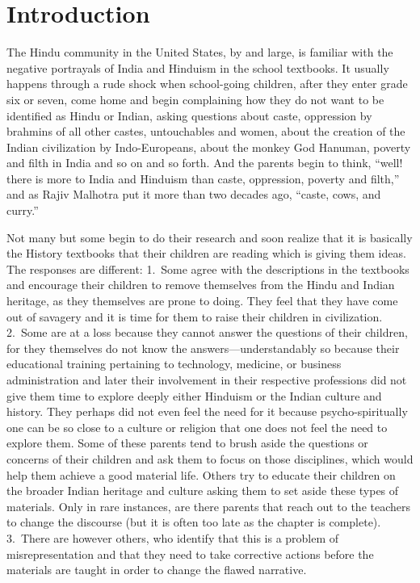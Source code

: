 \chapter*{Introduction}


The Hindu community in the United States, by and large, is familiar with the negative portrayals of India and Hinduism in the school textbooks. It usually happens through a rude shock when school-going children, after they enter grade six or seven, come home and begin complaining how they do not want to be identified as Hindu or Indian, asking questions about caste, oppression by brahmins of all other castes, untouchables and women, about the creation of the Indian civilization by Indo-Europeans, about the monkey God Hanuman, poverty and filth in India and so on and so forth. And the parents begin to think, “well! there is more to India and Hinduism than caste, oppression, poverty and filth,” and as Rajiv Malhotra put it more than two decades ago, “caste, cows, and curry.”

Not many but some begin to do their research and soon realize that it is basically the History textbooks that their children are reading which is giving them ideas. The responses are different: 1.\ Some agree with the descriptions in the textbooks and encourage their children to remove themselves from the Hindu and Indian heritage, as they themselves are prone to doing. They feel that they have come out of savagery and it is time for them to raise their children in civilization. 2.\ Some are at a loss because they cannot answer the questions of their children, for they themselves do not know the answers—understandably so because their educational training pertaining to technology, medicine, or business administration and later their involvement in their respective professions did not give them time to explore deeply either Hinduism or the Indian culture and history. They perhaps did not even feel the need for it because psycho-spiritually one can be so close to a culture or religion that one does not feel the need to explore them. Some of these parents tend to brush aside the questions or concerns of their children and ask them to focus on those disciplines, which would help them achieve a good material life. Others try to educate their children on the broader Indian heritage and culture asking them to set aside these types of materials. Only in rare instances, are there parents that reach out to the teachers to change the discourse (but it is often too late as the chapter is complete). 3.\ There are however others, who identify that this is a problem of misrepresentation and that they need to take corrective actions before the materials are taught in order to change the flawed narrative. 

